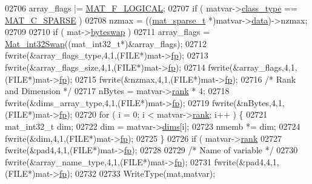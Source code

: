\begin{DoxyCode}
{{{{{{{{{{{{{{{{02706         array\_flags |= \hyperlink{group___m_a_t_ggab9d6ef9e3ddca78a317b173f01d53fbba57eb5c6e200bcbc0f1b7982f29a169c2}{MAT\_F\_LOGICAL};
02707     \textcolor{keywordflow}{if} ( matvar->\hyperlink{group___m_a_t_aff13035bf3265dd7d9425e5d40c839d4}{class\_type} == \hyperlink{group___m_a_t_ggad4d60ae7b709fc81bfd744fb4c857c40a0d5655b7e6178a2242cb3bb56ff4c8d2}{MAT\_C\_SPARSE} )
02708         nzmax = ((\hyperlink{group___m_a_t_structmat__sparse__t}{mat\_sparse\_t} *)matvar->\hyperlink{group___m_a_t_a5672978efa230bbdecdf38ede781f7fa}{data})->nzmax;
02709 
02710     \textcolor{keywordflow}{if} ( mat->\hyperlink{struct__mat__t_a99d207977af5e04941ace56d71817a40}{byteswap} )
02711         array\_flags = \hyperlink{endian_8c_a2e0153996243f0a34df9a5286087cfa3}{Mat\_int32Swap}((mat\_int32\_t*)&array\_flags);
02712     fwrite(&array\_flags\_type,4,1,(FILE*)mat->\hyperlink{struct__mat__t_a85f562e407ca9ad4d2a6e14f839432b7}{fp});
02713     fwrite(&array\_flags\_size,4,1,(FILE*)mat->\hyperlink{struct__mat__t_a85f562e407ca9ad4d2a6e14f839432b7}{fp});
02714     fwrite(&array\_flags,4,1,(FILE*)mat->\hyperlink{struct__mat__t_a85f562e407ca9ad4d2a6e14f839432b7}{fp});
02715     fwrite(&nzmax,4,1,(FILE*)mat->\hyperlink{struct__mat__t_a85f562e407ca9ad4d2a6e14f839432b7}{fp});
02716     \textcolor{comment}{/* Rank and Dimension */}
02717     nBytes = matvar->\hyperlink{group___m_a_t_a84ba70c96ded13cc555fa75b768d9921}{rank} * 4;
02718     fwrite(&dims\_array\_type,4,1,(FILE*)mat->\hyperlink{struct__mat__t_a85f562e407ca9ad4d2a6e14f839432b7}{fp});
02719     fwrite(&nBytes,4,1,(FILE*)mat->\hyperlink{struct__mat__t_a85f562e407ca9ad4d2a6e14f839432b7}{fp});
02720     \textcolor{keywordflow}{for} ( i = 0; i < matvar->\hyperlink{group___m_a_t_a84ba70c96ded13cc555fa75b768d9921}{rank}; i++ ) \{
02721         mat\_int32\_t dim;
02722         dim = matvar->\hyperlink{group___m_a_t_a8e01234e1c862ce3472bb37f5a09b92c}{dims}[i];
02723         nmemb *= dim;
02724         fwrite(&dim,4,1,(FILE*)mat->\hyperlink{struct__mat__t_a85f562e407ca9ad4d2a6e14f839432b7}{fp});
02725     \}
02726     \textcolor{keywordflow}{if} ( matvar->\hyperlink{group___m_a_t_a84ba70c96ded13cc555fa75b768d9921}{rank} %
02727         fwrite(&pad4,4,1,(FILE*)mat->\hyperlink{struct__mat__t_a85f562e407ca9ad4d2a6e14f839432b7}{fp});
02728 
02729     \textcolor{comment}{/* Name of variable */}
02730     fwrite(&array\_name\_type,4,1,(FILE*)mat->\hyperlink{struct__mat__t_a85f562e407ca9ad4d2a6e14f839432b7}{fp});
02731     fwrite(&pad4,4,1,(FILE*)mat->\hyperlink{struct__mat__t_a85f562e407ca9ad4d2a6e14f839432b7}{fp});
02732 
02733     WriteType(mat,matvar);
}}}}}}}}}}}}}}}}
\end{DoxyCode}
